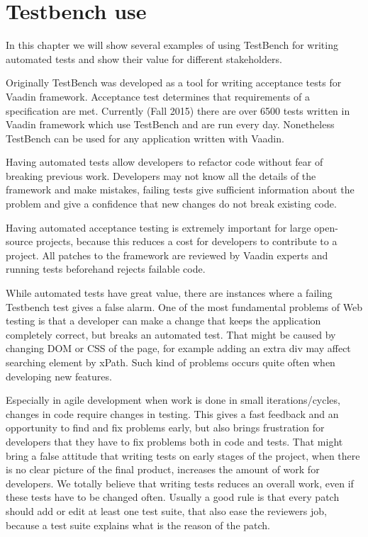 \chapter{Testbench use}
\label{ch:testbenchuse}
In this chapter we will show several examples of using TestBench for writing
automated tests and show their value for different stakeholders. 

Originally TestBench was developed as a tool for writing acceptance tests for 
Vaadin framework. Acceptance test determines that requirements of a
specification are met. Currently (Fall 2015) there are over 6500 tests written
in Vaadin framework which use TestBench and are run every day. Nonetheless TestBench can be used for any application written
with Vaadin.

Having automated tests allow developers to refactor code without fear of
breaking previous work. Developers may not know all the details of the framework and make mistakes,
 failing tests give sufficient information about the problem 
 and give a confidence that new changes do not break existing code.
   
 Having automated acceptance testing is extremely important for large
 open-source projects, because this reduces a cost for developers to contribute
 to a project.  All patches to the framework are reviewed by Vaadin experts and
 running tests beforehand rejects failable code.

 While automated tests have great value, there are instances
 where a failing Testbench test gives a false alarm. One of the most fundamental
  problems of Web testing is that a developer can make a change that keeps
   the application completely correct, but breaks an automated test.   
 That might be caused by changing DOM or CSS of the page, for example adding
    an extra div may affect searching element by xPath. Such kind of problems 
    occurs quite often when developing new features. 

Especially in agile development when work is done in small iterations/cycles, 
changes in code require changes in testing. This gives a fast feedback and
 an opportunity to find and fix problems early, but also brings frustration
  for developers that they have to fix problems both in code and tests. 
  That might bring a false attitude that writing tests on early stages of the project,
   when there is no clear picture of the final product,
    increases the amount of work for developers. 
    We totally believe that writing tests reduces an overall work,
     even if these tests have to be changed often.
      Usually a good rule is that every patch should add or edit at least one test suite, that
       also ease the reviewers job, because a test suite explains what is the reason of the patch. 

